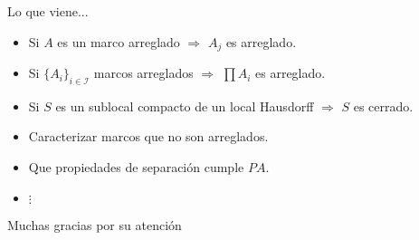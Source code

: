 \documentclass[compress,12pt]{beamer}
\begin{document}
\begin{frame}[standout]
Lo que viene...
\begin{itemize}
    \item<2-> Si $A$ es un marco arreglado $\Rightarrow$ $A_j$ es arreglado.
    \item<3-> Si $\{A_i\}_{i\in \mathcal{I}}$ marcos arreglados $\Rightarrow$ $\prod A_i$ es arreglado.
    \item<4-> Si $S$ es un sublocal compacto de un local Hausdorff $\Rightarrow$ $S$ es cerrado.
    \item<5-> Caracterizar marcos que no son arreglados.
    \item<6-> Que propiedades de separación cumple $PA$.
    \item<7-> $\vdots$
\end{itemize}
\end{frame}

\begin{frame}
      \centering
      \Huge{\smiley Muchas gracias por su atención\smiley}
\end{frame}

\End
\end{document}
